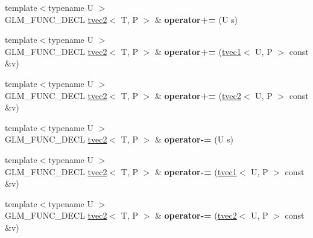 \begin{DoxyCompactItemize}
\item 
\hypertarget{structglm_1_1tvec2_af56749a307930b1e45c2f61d7af476c2}{{\footnotesize template$<$typename U $>$ }\\G\-L\-M\-\_\-\-F\-U\-N\-C\-\_\-\-D\-E\-C\-L \hyperlink{structglm_1_1tvec2}{tvec2}$<$ T, P $>$ \& {\bfseries operator+=} (U s)}\label{structglm_1_1tvec2_af56749a307930b1e45c2f61d7af476c2}

\item 
\hypertarget{structglm_1_1tvec2_a260a29a9ba826d24f418f01ebd274d39}{{\footnotesize template$<$typename U $>$ }\\G\-L\-M\-\_\-\-F\-U\-N\-C\-\_\-\-D\-E\-C\-L \hyperlink{structglm_1_1tvec2}{tvec2}$<$ T, P $>$ \& {\bfseries operator+=} (\hyperlink{structglm_1_1tvec1}{tvec1}$<$ U, P $>$ const \&v)}\label{structglm_1_1tvec2_a260a29a9ba826d24f418f01ebd274d39}

\item 
\hypertarget{structglm_1_1tvec2_a8b512889a3d9ef4536135b1806cb19c4}{{\footnotesize template$<$typename U $>$ }\\G\-L\-M\-\_\-\-F\-U\-N\-C\-\_\-\-D\-E\-C\-L \hyperlink{structglm_1_1tvec2}{tvec2}$<$ T, P $>$ \& {\bfseries operator+=} (\hyperlink{structglm_1_1tvec2}{tvec2}$<$ U, P $>$ const \&v)}\label{structglm_1_1tvec2_a8b512889a3d9ef4536135b1806cb19c4}

\item 
\hypertarget{structglm_1_1tvec2_ada376cf05dca5307a616e757db5a90b2}{{\footnotesize template$<$typename U $>$ }\\G\-L\-M\-\_\-\-F\-U\-N\-C\-\_\-\-D\-E\-C\-L \hyperlink{structglm_1_1tvec2}{tvec2}$<$ T, P $>$ \& {\bfseries operator-\/=} (U s)}\label{structglm_1_1tvec2_ada376cf05dca5307a616e757db5a90b2}

\item 
\hypertarget{structglm_1_1tvec2_ac78b83ac2b1331f1d99f1fa9465c4147}{{\footnotesize template$<$typename U $>$ }\\G\-L\-M\-\_\-\-F\-U\-N\-C\-\_\-\-D\-E\-C\-L \hyperlink{structglm_1_1tvec2}{tvec2}$<$ T, P $>$ \& {\bfseries operator-\/=} (\hyperlink{structglm_1_1tvec1}{tvec1}$<$ U, P $>$ const \&v)}\label{structglm_1_1tvec2_ac78b83ac2b1331f1d99f1fa9465c4147}

\item 
\hypertarget{structglm_1_1tvec2_a6ad11c3283bc3a6d76f92047e15d3fcc}{{\footnotesize template$<$typename U $>$ }\\G\-L\-M\-\_\-\-F\-U\-N\-C\-\_\-\-D\-E\-C\-L \hyperlink{structglm_1_1tvec2}{tvec2}$<$ T, P $>$ \& {\bfseries operator-\/=} (\hyperlink{structglm_1_1tvec2}{tvec2}$<$ U, P $>$ const \&v)}\label{structglm_1_1tvec2_a6ad11c3283bc3a6d76f92047e15d3fcc}


\end{DoxyCompactItemize}
